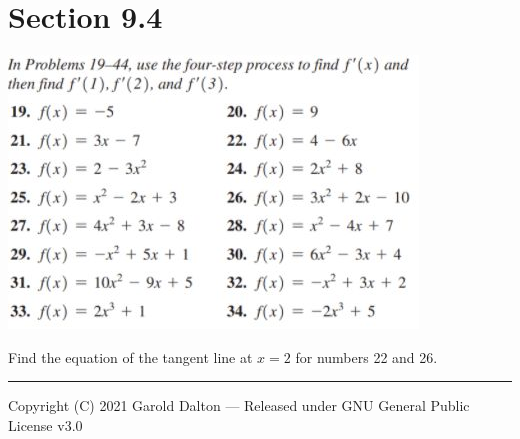 \documentclass[14pt]{extarticle}
\begin{document}
\section{Section 9.4}
\begin{center}
	\includegraphics[width=0.7\linewidth]{9-4-20b}
\end{center}
Find the equation of the tangent line at $x=2$ for numbers 22 and 26.




\noindent\rule{\textwidth}{1pt}
{\footnotesize Copyright (C) 2021 Garold Dalton --- Released under GNU General Public License v3.0}


\cleardoublepage
\end{document}
